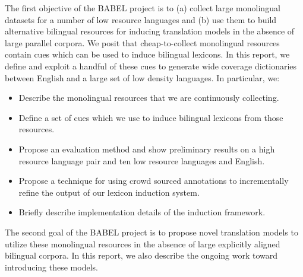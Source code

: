 \documentclass{article}
\begin{document}
The first objective of the BABEL project is to (a) collect large monolingual datasets for a number of low resource languages and (b) use them to build alternative bilingual resources for inducing translation models in the absence of large parallel corpora.  We posit that cheap-to-collect monolingual resources contain cues which can be used to induce bilingual lexicons. In this report, we define and exploit a handful of these cues to generate wide coverage dictionaries between English and a large set of low density languages. In particular, we:

\begin{itemize}
 \item Describe the monolingual resources that we are continuously collecting.
 \item Define a set of cues which we use to induce bilingual lexicons from those resources.
 \item Propose an evaluation method and show preliminary results on a high resource language pair and ten low resource languages and English.
 \item Propose a technique for using crowd sourced annotations to incrementally refine the output of our lexicon induction system.
 \item Briefly describe implementation details of the induction framework.
\end{itemize}

The second goal of the BABEL project is to propose novel translation models to utilize these monolingual resources in the absence of large explicitly aligned bilingual corpora.  In this report, we also describe the ongoing work toward introducing these models.\\

\end{document}
